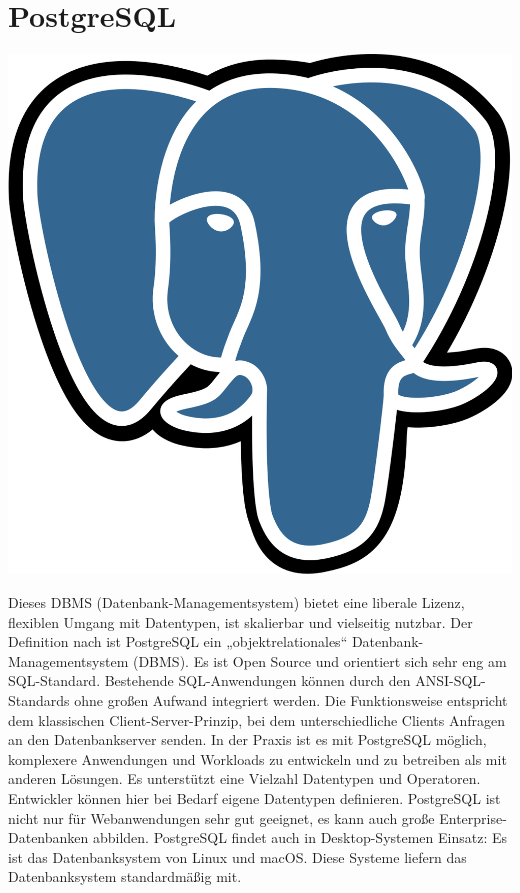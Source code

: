 \section{PostgreSQL}
\includegraphics[scale=0.015]{pics/logos/postgresqlLogo.png}

Dieses DBMS (Datenbank-Managementsystem) bietet eine liberale Lizenz, flexiblen Umgang mit Datentypen, ist skalierbar und vielseitig nutzbar.
Der Definition nach ist PostgreSQL ein „objektrelationales“ Datenbank-Managementsystem (DBMS). Es ist Open Source und orientiert sich sehr eng am SQL-Standard. Bestehende SQL-Anwendungen 
können durch den ANSI-SQL-Standards ohne großen Aufwand integriert werden. Die Funktionsweise entspricht dem klassischen Client-Server-Prinzip, bei dem unterschiedliche Clients Anfragen an den Datenbankserver senden.
In der Praxis ist es mit PostgreSQL möglich, komplexere Anwendungen und Workloads zu entwickeln und zu betreiben als mit anderen Lösungen. 
Es unterstützt eine Vielzahl Datentypen und Operatoren. Entwickler können hier bei Bedarf eigene Datentypen definieren. PostgreSQL ist nicht nur für Webanwendungen sehr gut geeignet, es kann auch große Enterprise-Datenbanken abbilden. 
PostgreSQL findet auch in Desktop-Systemen Einsatz: Es ist das Datenbanksystem von Linux und macOS. Diese Systeme liefern das Datenbanksystem standardmäßig mit.
\cite{sysarch-postgresql-1}

